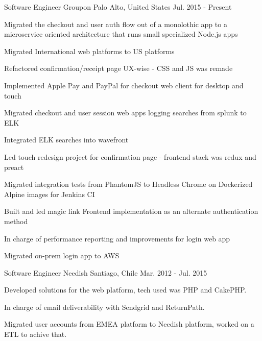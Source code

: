 

\begin{cventries}

  \cventry
    {Software Engineer} %
    {Groupon} %
    {Palo Alto, United States} %
    {Jul. 2015 - Present} %
    {
      \begin{cvitems} %
        \item {Migrated the checkout and user auth flow out of a monolothic app to a microservice oriented architecture that runs small specialized Node.js apps}
        \item {Migrated International web platforms to US platforms}
        \item {Refactored confirmation/receipt page UX-wise - CSS and JS was remade}
        \item {Implemented Apple Pay and PayPal for checkout web client for desktop and touch}
        \item {Migrated checkout and user session web apps logging searches from splunk to ELK}
        \item {Integrated ELK searches into wavefront}
        \item {Led touch redesign project for confirmation page - frontend stack was redux and preact}
        \item {Migrated integration tests from PhantomJS to Headless Chrome on Dockerized Alpine images for Jenkins CI}
        \item {Built and led magic link Frontend implementation as an alternate authentication method}
        \item {In charge of performance reporting and improvements for login web app}
        \item {Migrated on-prem login app to AWS}
      \end{cvitems}
    }

  \cventry
    {Software Engineer} %
    {Needish} %
    {Santiago, Chile} %
    {Mar. 2012 - Jul. 2015} %
    {
      \begin{cvitems} %
        \item {Developed solutions for the web platform, tech used was PHP and CakePHP.}
        \item {In charge of email deliverability with Sendgrid and ReturnPath.}
        \item {Migrated user accounts from EMEA platform to Needish platform, worked on a ETL to achive that.}
      \end{cvitems}
    }


\end{cventries}
